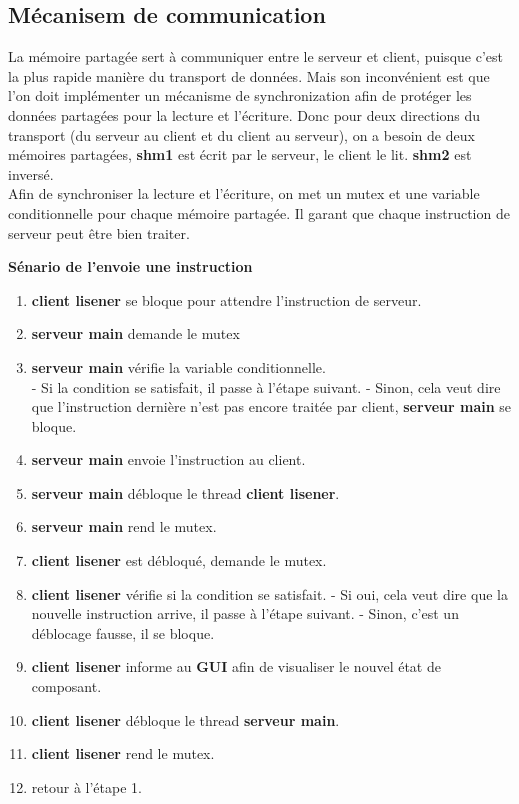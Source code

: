 \documentclass[14px]{article}
\begin{document}
\subsection{Mécanisem de communication}
La mémoire partagée sert à communiquer entre le serveur et client, puisque c'est la plus rapide manière du transport de données. Mais son inconvénient est que l'on doit implémenter un mécanisme de synchronization afin de protéger les données partagées pour la lecture et l'écriture. Donc pour deux directions du transport (du serveur au client et du client au serveur), on a besoin de deux mémoires partagées, \textbf{shm1} est écrit par le serveur, le client le lit. \textbf{shm2} est inversé.\\

Afin de synchroniser la lecture et l'écriture, on met un mutex et une variable conditionnelle pour chaque mémoire partagée. Il garant que chaque instruction de serveur peut être bien traiter.

\textbf{Sénario de l'envoie une instruction}
\begin{enumerate}
	\item \textbf{client lisener} se bloque pour attendre l'instruction de serveur.
	\item \textbf{serveur main} demande le mutex
	\item \textbf{serveur main} vérifie la variable conditionnelle.\\
	- Si la condition se satisfait, il passe à l'étape suivant.
	- Sinon, cela veut dire que l'instruction dernière n'est pas encore traitée par client, \textbf{serveur main} se bloque.
	\item \textbf{serveur main} envoie l'instruction au client.
	\item \textbf{serveur main} débloque le thread \textbf{client lisener}.
	\item \textbf{serveur main} rend le mutex.
	\item \textbf{client lisener} est débloqué, demande le mutex.
	\item \textbf{client lisener} vérifie si la condition se satisfait.
	- Si oui, cela veut dire que la nouvelle instruction arrive, il passe à l'étape suivant.
	- Sinon, c'est un déblocage fausse, il se bloque.
	\item \textbf{client lisener} informe au \textbf{GUI} afin de visualiser le nouvel état de composant.
	\item \textbf{client lisener} débloque le thread \textbf{serveur main}.
	\item \textbf{client lisener} rend le mutex.
	\item retour à l'étape 1.
\end{enumerate}
\end{document}
